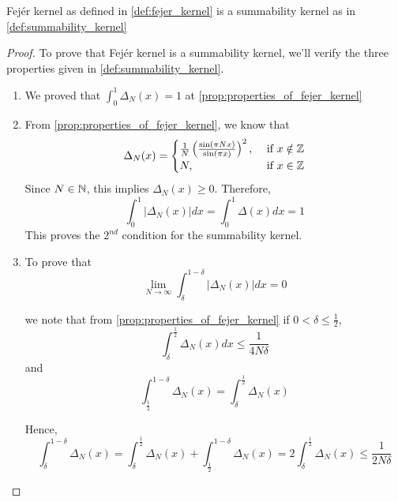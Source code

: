   \begin{proposition}
    \label{prop:fejer_kernel_is_summability_kernel}
    Fej\'er kernel as defined in \autoref{def:fejer_kernel} is a summability kernel as in \autoref{def:summability_kernel}
  \end{proposition}
  \begin{proof}
    To prove that Fej\'er kernel is a summability kernel, we'll verify the three properties given in \autoref{def:summability_kernel}.
    \begin{enumerate}
      \item
        We proved that $\int_0^1 \Delta_N(x) = 1$ at \autoref{prop:properties_of_fejer_kernel}
      \item
        From \autoref{prop:properties_of_fejer_kernel}, we know that
        \begin{displaymath}
          \Delta_N(x) = 
          \begin{cases}
            \frac{1}{N} \left(\frac{\sin(\pi Nx)}{\sin(\pi x)}\right)^2, &\text{ if } x \notin \mathbb Z \\
            N, &\text{ if } x \in \mathbb Z \\
          \end{cases}
        \end{displaymath}
        Since $N \in \mathbb N$, this implies $\Delta_N(x) \ge 0$. Therefore,
        \begin{displaymath}
          \int_0^1 \left|\Delta_N(x)\right| dx = \int_0^1 \Delta(x) dx = 1
        \end{displaymath}
        This proves the $2^{nd}$ condition for the summability kernel.
        
      \item
        To prove that 
        \begin{displaymath}
          \lim_{N \to \infty}\int_\delta^{1-\delta} \left|\Delta_N(x) \right| dx = 0
        \end{displaymath}

        we note that from \autoref{prop:properties_of_fejer_kernel} if $0< \delta \le \frac{1}{2}$, $$ \int_\delta^{\frac{1}{2}}\Delta_N(x) dx \le \frac{1}{4N\delta}$$
        and 
        $$\int_\frac{1}{2}^{1-\delta} \Delta_N(x) =  \int_\delta^\frac{1}{2} \Delta_N(x)$$

        Hence,
        \begin{displaymath}
          \int_\delta^{1-\delta} \Delta_N(x) = \int_\delta^\frac{1}{2} \Delta_N(x) + \int_\frac{1}{2}^{1-\delta} \Delta_N(x) = 2 \int_\delta^\frac{1}{2} \Delta_N(x) \le \frac{1}{2N\delta}
        \end{displaymath}
       

\end{enumerate}
\end{proof}
